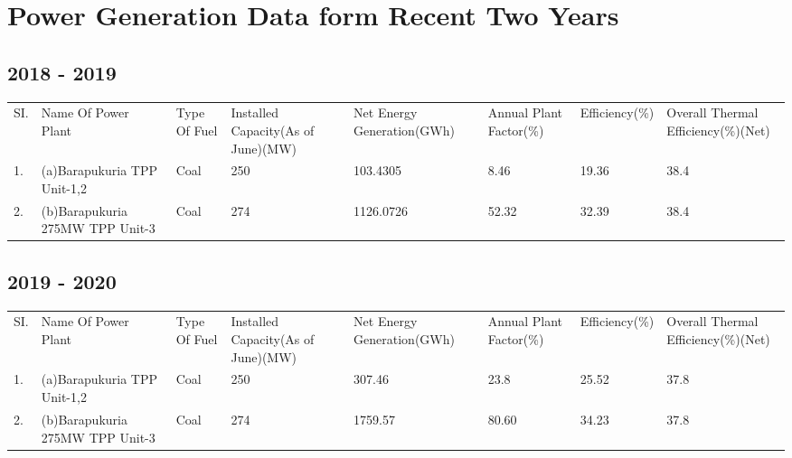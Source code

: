 \documentclass[11 pt]{article}
\begin{document}
\section{Power Generation Data form Recent Two Years}
\subsection{2018 - 2019}
	\begin{longtable}{| m{0.8 em} | m{4 em} | m{1.5 em} | m{4.5 em} | m{4 em} | m{2.2 em} | m{3.1 em} | m{4 em} |}
		\hline\hline
		\rowcolor{teal!20}
		\multicolumn{8}{c}{\textbf{\textsf{\textcolor{black}{Power Generation}}}}\\
		\hline\hline
		\rowcolor{blue!50}
			\footnotesize{SI.} & \footnotesize{Name Of Power Plant} & \footnotesize{Type Of Fuel} & \footnotesize{Installed Capacity(As of June)(MW)} & \tiny{Net Energy Generation(GWh)} & \tiny{Annual Plant Factor(\%)} & \tiny{Efficiency(\%)} & \tiny{Overall Thermal Efficiency(\%)(Net)}\\
		\hline\hline
		1. & \tiny{(a)Barapukuria TPP Unit-1,2} & {\footnotesize Coal} & 250 & 103.4305 & 8.46 & 19.36 & 38.4\\
		\hline
		2. & \tiny{(b)Barapukuria 275MW TPP Unit-3} & {\footnotesize Coal} & 274 & 1126.0726 & 52.32 & 32.39 & 38.4\\
		\hline\hline
	\end{longtable}
\pagebreak
\subsection{2019 - 2020}

	\begin{longtable}{| m{0.8 em} | m{4 em} | m{1.5 em} | m{4.5 em} | m{4 em} | m{2.2 em} | m{3.1 em} | m{4 em} |}
		\hline\hline
		\rowcolor{teal!20}
		\multicolumn{8}{c}{\textbf{\textsf{\textcolor{black}{Power Generation}}}}\\
		\hline\hline
		\rowcolor{blue!50}
			\footnotesize{SI.} & \footnotesize{Name Of Power Plant} & \footnotesize{Type Of Fuel} & \footnotesize{Installed Capacity(As of June)(MW)} & \tiny{Net Energy Generation(GWh)} & \tiny{Annual Plant Factor(\%)} & {\tiny Efficiency(\%)} & \tiny{Overall Thermal Efficiency(\%)(Net)}\\
		\hline\hline
		1. & \tiny{(a)Barapukuria TPP Unit-1,2} & {\footnotesize Coal} & 250 & 307.46 & 23.8 & 25.52 & 37.8\\
		\hline
		2. & \tiny{(b)Barapukuria 275MW TPP Unit-3} & {\footnotesize Coal} & 274 & 1759.57 & 80.60 & 34.23 & 37.8\\
		\hline\hline
	\end{longtable}
	
\end{document}
